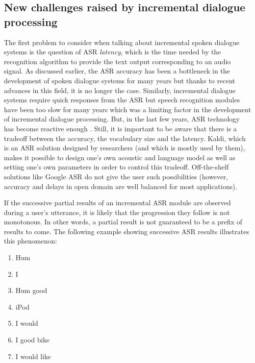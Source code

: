                                   \subsection{New challenges raised by incremental dialogue processing}
                                  \label{soa:challengesincr}
    
                                  The first problem to consider when talking about incremental spoken dialogue systems is the question of ASR \textit{latency}, which is the time needed by the recognition algorithm to provide the text output corresponding to an audio signal. As discussed earlier, the ASR accuracy has been a bottleneck in the development of spoken dialogue systems for many years but thanks to recent advances in this field, it is no longer the case. Similarly, incremental dialogue systems require quick responses from the ASR but speech recognition modules have been too slow for many years which was a limiting factor in the development of incremental dialogue processing. But, in the last few years, ASR technology has become reactive enough \cite{Breslin2013,Platek2014}. Still, it is important to be aware that there is a tradeoff between the accuracy, the vocabulary size and the latency. Kaldi, which is an ASR solution designed by researchers (and which is mostly used by them), makes it possible to design one's own acoustic and language model as well as setting one's own parameters in order to control this tradeoff. Off-the-shelf solutions like Google ASR do not give the user such possibilities (however, accuracy and delays in open domain are well balanced for most applications).

                                  If the successive partial results of an incremental ASR module are observed during a user's utterance, it is likely that the progression they follow is not monotonous. In other words, a partial result is not guaranteed to be a prefix of results to come. The following example showing successive ASR results illustrates this phenomenon:

                                  \begin{enumerate}
                                     \item Hum
                                     \item I
                                     \item Hum good
                                     \item iPod
                                     \item I would
                                     \item I good bike
                                     \item I would like
                                  \end{enumerate}

